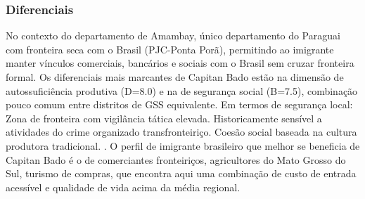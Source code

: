 \subsubsection*{Diferenciais}\label{dif-capitan-bado-1303}
No contexto do departamento de Amambay, único departamento do Paraguai com fronteira seca com o Brasil (PJC-Ponta Porã), permitindo ao imigrante manter vínculos comerciais, bancários e sociais com o Brasil sem cruzar fronteira formal. Os diferenciais mais marcantes de Capitan Bado estão na dimensão de autossuficiência produtiva (D=8.0) e na de segurança social (B=7.5), combinação pouco comum entre distritos de GSS equivalente. Em termos de segurança local: Zona de fronteira com vigilância tática elevada. Historicamente sensível a atividades do crime organizado transfronteiriço. Coesão social baseada na cultura produtora tradicional. . O perfil de imigrante brasileiro que melhor se beneficia de Capitan Bado é o de comerciantes fronteiriços, agricultores do Mato Grosso do Sul, turismo de compras, que encontra aqui uma combinação de custo de entrada acessível e qualidade de vida acima da média regional.
